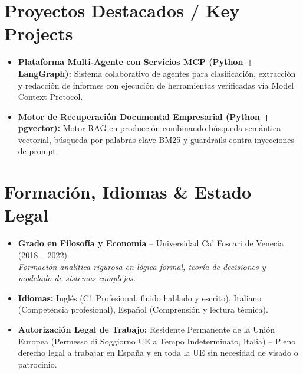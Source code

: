 \documentclass[a4paper,10pt]{article}
\begin{document}
\section{Proyectos Destacados / Key Projects}
\begin{itemize}
  \item \textbf{Plataforma Multi-Agente con Servicios MCP (Python + LangGraph):} Sistema colaborativo de agentes para clasificación, extracción y redacción de informes con ejecución de herramientas verificadas vía Model Context Protocol.
  \item \textbf{Motor de Recuperación Documental Empresarial (Python + pgvector):} Motor RAG en producción combinando búsqueda semántica vectorial, búsqueda por palabras clave BM25 y guardrails contra inyecciones de prompt.
\end{itemize}

\section{Formación, Idiomas \& Estado Legal}
\begin{itemize}
  \item \textbf{Grado en Filosofía y Economía} -- Universidad Ca' Foscari de Venecia (2018 -- 2022) \\
  \textit{Formación analítica rigurosa en lógica formal, teoría de decisiones y modelado de sistemas complejos.}
  \item \textbf{Idiomas:} Inglés (C1 Profesional, fluido hablado y escrito), Italiano (Competencia profesional), Español (Comprensión y lectura técnica).
  \item \textbf{Autorización Legal de Trabajo:} Residente Permanente de la Unión Europea (Permesso di Soggiorno UE a Tempo Indeterminato, Italia) -- Pleno derecho legal a trabajar en España y en toda la UE sin necesidad de visado o patrocinio.
\end{itemize}
\end{document}
